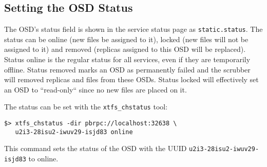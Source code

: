 \documentclass[a4paper,10pt]{book}
\begin{document}
\subsection{Setting the OSD Status}

The OSD's status field is shown in the service status page as \texttt{static.status}. The status can be online (new files be assigned to it), locked (new files will not be assigned to it) and removed (replicas assigned to this OSD will be replaced). Status online is the regular status for all services, even if they are temporarily offline. Status removed marks an OSD as permanently failed and the scrubber will removed replicas and files from these OSDs. Status locked will effectively set an OSD to ``read-only`` since no new files are placed on it.

The status can be set with the \texttt{xtfs\_chstatus} tool:

\begin{verbatim}
$> xtfs_chstatus -dir pbrpc://localhost:32638 \
   u2i3-28isu2-iwuv29-isjd83 online
\end{verbatim}

This command sets the status of the OSD with the UUID \texttt{u2i3-28isu2-iwuv29-isjd83} to online.

%
%
%
%
%
\end{document}
